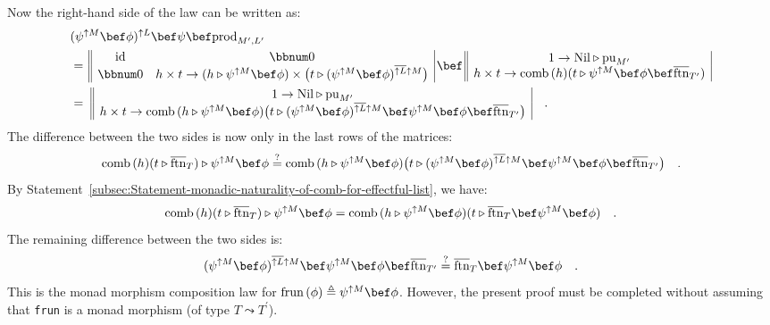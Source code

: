 Now the right-hand side of the law can be written as:
\begin{align*}
 & (\psi^{\uparrow M}\bef\phi)^{\uparrow L}\bef\psi\bef\text{prod}_{M^{\prime},L^{\prime}}\\
 & =\,\begin{array}{||cc|}
\text{id} & \bbnum 0\\
\bbnum 0 & h\times t\rightarrow(h\triangleright\psi^{\uparrow M}\bef\phi)\times\big(t\triangleright(\psi^{\uparrow M}\bef\phi)^{\overline{\uparrow L}\uparrow M}\big)
\end{array}\,\bef\,\begin{array}{||c|}
1\rightarrow\text{Nil}\triangleright\text{pu}_{M^{\prime}}\\
h\times t\rightarrow\text{comb}\,(h)(t\triangleright\psi^{\uparrow M}\bef\phi\bef\overline{\text{ftn}}_{T^{\prime}})
\end{array}\\
 & =\,\,\begin{array}{||c|}
1\rightarrow\text{Nil}\triangleright\text{pu}_{M^{\prime}}\\
h\times t\rightarrow\text{comb}\,(h\triangleright\psi^{\uparrow M}\bef\phi)\big(t\triangleright(\psi^{\uparrow M}\bef\phi)^{\overline{\uparrow L}\uparrow M}\bef\psi^{\uparrow M}\bef\phi\bef\overline{\text{ftn}}_{T^{\prime}}\big)
\end{array}\quad.
\end{align*}
The difference between the two sides is now only in the last rows
of the matrices:
\[
\text{comb}\,(h)(t\triangleright\overline{\text{ftn}}_{T})\triangleright\psi^{\uparrow M}\bef\phi\overset{?}{=}\text{comb}\,(h\triangleright\psi^{\uparrow M}\bef\phi)\big(t\triangleright(\psi^{\uparrow M}\bef\phi)^{\overline{\uparrow L}\uparrow M}\bef\psi^{\uparrow M}\bef\phi\bef\overline{\text{ftn}}_{T^{\prime}}\big)\quad.
\]
By Statement~\ref{subsec:Statement-monadic-naturality-of-comb-for-effectful-list},
we have:
\[
\text{comb}\,(h)(t\triangleright\overline{\text{ftn}}_{T})\triangleright\psi^{\uparrow M}\bef\phi=\text{comb}\,(h\triangleright\psi^{\uparrow M}\bef\phi)(t\triangleright\overline{\text{ftn}}_{T}\bef\psi^{\uparrow M}\bef\phi)\quad.
\]
The remaining difference between the two sides is:
\[
(\psi^{\uparrow M}\bef\phi)^{\overline{\uparrow L}\uparrow M}\bef\psi^{\uparrow M}\bef\phi\bef\overline{\text{ftn}}_{T^{\prime}}\overset{?}{=}\overline{\text{ftn}}_{T}\bef\psi^{\uparrow M}\bef\phi\quad.
\]
This is the monad morphism composition law for $\text{frun}\,(\phi)\triangleq\psi^{\uparrow M}\bef\phi$.
However, the present proof must be completed without assuming that
\lstinline!frun! is a monad morphism (of type $T\leadsto T^{\prime}$).

